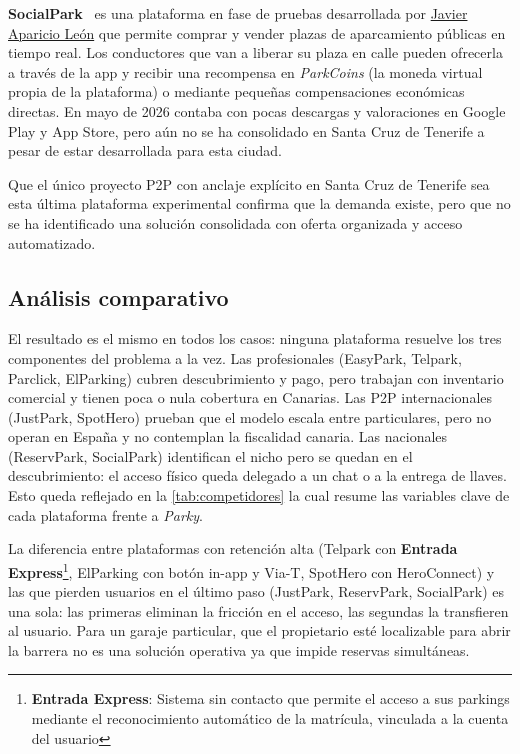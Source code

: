 \textbf{SocialPark}~\cite{socialpark2026} es una plataforma en fase de pruebas desarrollada por \underline{Javier Aparicio León} que permite comprar y vender plazas de aparcamiento públicas en tiempo real. Los conductores que van a liberar su plaza en calle pueden ofrecerla a través de la app y recibir una recompensa en \textit{ParkCoins} (la moneda virtual propia de la plataforma) o mediante pequeñas compensaciones económicas directas. En mayo de 2026 contaba con pocas descargas y valoraciones en Google Play y App Store, pero aún no se ha consolidado en Santa Cruz de Tenerife a pesar de estar desarrollada para esta ciudad.

Que el único proyecto P2P con anclaje explícito en Santa Cruz de Tenerife sea esta última plataforma experimental confirma que la demanda existe, pero que no se ha identificado una solución consolidada con oferta organizada y acceso automatizado.

\subsection{Análisis comparativo}

El resultado es el mismo en todos los casos: ninguna plataforma resuelve los tres componentes del problema a la vez. Las profesionales (EasyPark, Telpark, Parclick,
ElParking) cubren descubrimiento y pago, pero trabajan con inventario comercial y tienen poca o nula cobertura en Canarias. Las P2P internacionales (JustPark, SpotHero)
prueban que el modelo escala entre particulares, pero no operan en España y no contemplan la fiscalidad canaria. Las nacionales (ReservPark, SocialPark) identifican
el nicho pero se quedan en el descubrimiento: el acceso físico queda delegado a un chat o a la entrega de llaves. Esto queda reflejado en la \autoref{tab:competidores} la cual resume las variables clave de cada plataforma frente a \textit{Parky}.

La diferencia entre plataformas con retención alta (Telpark con \textbf{Entrada Express}\footnote{\textbf{Entrada Express}: Sistema sin contacto que permite el acceso a sus parkings mediante el reconocimiento automático de la matrícula, vinculada a la cuenta del usuario}, ElParking con botón in-app y Via-T, SpotHero con HeroConnect) y las que
pierden usuarios en el último paso (JustPark, ReservPark, SocialPark) es una sola: las primeras eliminan la fricción en el acceso, las segundas la transfieren al usuario.
Para un garaje particular, que el propietario esté localizable para abrir la barrera no es una solución operativa ya que impide reservas simultáneas.

